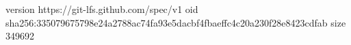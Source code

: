 version https://git-lfs.github.com/spec/v1
oid sha256:335079675798e24a2788ac74fa93e5dacbf4fbaeffc4c20a230f28e8423cdfab
size 349692
